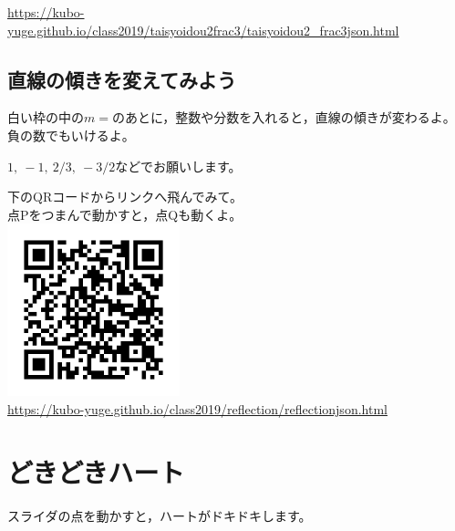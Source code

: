 \documentclass[uplatex,dvipdfmx,a4paper,twoside]{jsarticle}
\begin{document}
\begin{multicols}{2}
\url{https://kubo-yuge.github.io/class2019/taisyoidou2frac3/taisyoidou2_frac3json.html}\\

\columnbreak

\subsection{直線の傾きを変えてみよう}

白い枠の中の$m=$のあとに，整数や分数を入れると，直線の傾きが変わるよ。負の数でもいけるよ。\par
$1,\ -1,\ 2/3,\ -3/2$などでお願いします。\par
\begin{layer}{80}{0}
\end{layer}\par
\vspace{15\baselineskip}

下のQRコードからリンクへ飛んでみて。\\
点Pをつまんで動かすと，点Qも動くよ。\\

\includegraphics[bb=18 18 170 170,width=50mm,clip]{対称移動4QR.png}\\

\url{https://kubo-yuge.github.io/class2019/reflection/reflectionjson.html}\\

\columnbreak

\section{どきどきハート}

スライダの点を動かすと，ハートがドキドキします。\par
\begin{layer}{80}{0}
\end{layer}\par
\vspace{11\baselineskip}


\end{multicols}
\end{document}
